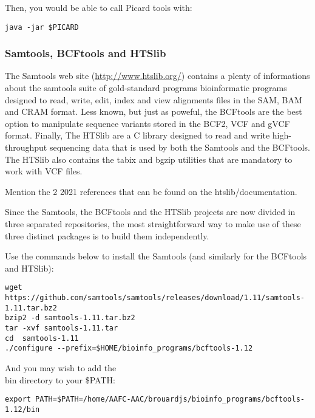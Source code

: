 Then, you would be able to call Picard tools with:

\begin{verbatim}
java -jar $PICARD
\end{verbatim}


\subsubsection{Samtools, BCFtools and HTSlib}




The Samtools web site (\href{http://www.htslib.org/}{http://www.htslib.org/}) contains a plenty of informations about the samtools suite of gold-standard programs bioinformatic programs designed to read, write, edit, index and view alignments files in the SAM, BAM and CRAM format. Less known, but just as poweful, the BCFtools are the best option to manipulate sequence variants stored in the BCF2, VCF and gVCF format. Finally, The HTSlib are a C library designed to read and write high-throughput sequencing data that is used by both the Samtools and the BCFtools. The HTSlib also contains the tabix and bgzip utilities that are mandatory to work with VCF files.

Mention the 2 2021 references that can be found on the htslib/documentation.

Since the Samtools, the BCFtools and the HTSlib projects are now divided in three separated repositories, the most straightforward way to make use of these three distinct packages is to build them independently. 

Use the commands below to install the Samtools (and similarly for the BCFtools and HTSlib):

\begin{verbatim}
wget https://github.com/samtools/samtools/releases/download/1.11/samtools-1.11.tar.bz2
bzip2 -d samtools-1.11.tar.bz2	
tar -xvf samtools-1.11.tar
cd  samtools-1.11
./configure --prefix=$HOME/bioinfo_programs/bcftools-1.12
\end{verbatim}

And you may wish to add the \\bin directory to your \$PATH:

\begin{verbatim}
export PATH=$PATH=/home/AAFC-AAC/brouardjs/bioinfo_programs/bcftools-1.12/bin
\end{verbatim}









